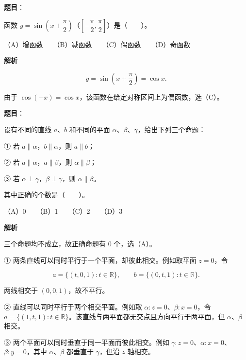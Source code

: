 \begin{answer}

\textbf{题目}：

函数 $y=\sin\left(x+\dfrac{\pi}{2}\right)$（$\left[-\dfrac{\pi}{2},\dfrac{\pi}{2}\right]$）是\mbox{（　　）}。

（A）增函数　　（B）减函数　　（C）偶函数　　（D）奇函数

\textbf{解析}

\nopagebreak[4]
\[
y=\sin\left(x+\frac\pi2\right)=\cos x.
\]

由于 $\cos(-x)=\cos x$，该函数在给定对称区间上为偶函数，选（C）。


\end{answer}
\begin{answer}

\textbf{题目}：

设有不同的直线 $a$、$b$ 和不同的平面 $\alpha$、$\beta$、$\gamma$，给出下列三个命题：

① 若 $a\parallel\alpha$，$b\parallel\alpha$，则 $a\parallel b$；

② 若 $a\parallel\alpha$，$a\parallel\beta$，则 $\alpha\parallel\beta$；

③ 若 $\alpha\perp\gamma$，$\beta\perp\gamma$，则 $\alpha\parallel\beta$。

其中正确的个数是\mbox{（　　）}。

（A）0　　（B）1　　（C）2　　（D）3

\textbf{解析}

三个命题均不成立，故正确命题有 $0$ 个，选（A）。

① 两条直线可以同时平行于一个平面，却彼此相交。例如取平面 $z=0$，令

\nopagebreak[4]
\[
a=\{(t,0,1):t\in\mathbb R\},\qquad
b=\{(0,t,1):t\in\mathbb R\}.
\]

两线相交于 $(0,0,1)$，故不平行。

② 直线可以同时平行于两个相交平面。例如取 $\alpha:z=0$、$\beta:x=0$，令 $a=\{(1,t,1):t\in\mathbb R\}$。该直线与两平面都无交点且方向平行于两平面，但 $\alpha$、$\beta$ 相交。

③ 两个平面可以同时垂直于同一平面而彼此相交。例如 $\gamma:z=0$、$\alpha:x=0$、$\beta:y=0$，其中 $\alpha$、$\beta$ 都垂直于 $\gamma$，但沿 $z$ 轴相交。


\end{answer}
